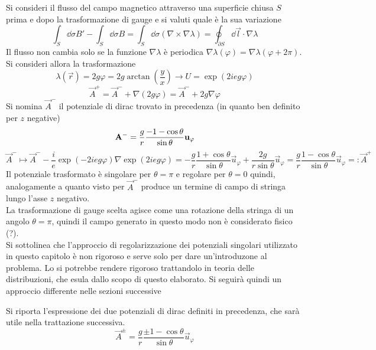 Si consideri il flusso del campo magnetico attraverso una superficie chiusa $S$
prima e dopo la trasformazione di gauge e si valuti quale è la sua variazione
$$
   \int_S \dd\sigma B' - \int_S \dd\sigma B = \int_S \dd\sigma (\nabla \times \nabla \lambda)
      = \oint_{\partial S} \dd\vec l \cdot \nabla \lambda
$$
Il flusso non cambia solo se la funzione $\nabla \lambda$ è periodica $\nabla
\lambda(\varphi) = \nabla \lambda( \varphi + 2\pi)$. Si consideri allora la trasformazione
$$
\lambda(\vec r) = 2g\varphi = 2g\arctan\left(\frac{y}{x}\right) \to U = \exp(2ieg\varphi)
$$
\begin{equation}\label{eq:gaugetrasf}
   \vec A ^+ = \vec A ^- + \nabla(2g \varphi) = \vec A ^- + 2g\nabla\varphi
\end{equation}
Si nomina $\vec A^-$ il potenziale di dirac trovato in precedenza (in quanto ben
definito per $z$ negative)
$$
   \vec A^- = \frac{g}{r}\frac{-1 - \cos\theta}{\sin\theta} \vec u _\varphi  \\
$$
$$
  \vec A ^- \mapsto \vec A ^- - \frac{i}{e} \exp( -2ieg\varphi )\nabla \exp(2ieg\varphi ) =
     -\frac{g}{r}\frac{1+\cos\theta}{\sin\theta}\vec u _\varphi
     + \frac{2g}{r\sin\theta}\vec u _\varphi
     = \frac{g}{r}\frac{1 - \cos\theta}{\sin\theta} \vec u _\varphi
     =: \vec A ^+
$$
Il potenziale trasformato è singolare per $\theta = \pi$ e regolare per
$\theta =  0$ quindi, analogamente a quanto visto per $\vec A^-$ produce un termine
di campo di stringa lungo l'asse $z$ negativo.\\
La trasformazione di gauge scelta agisce come una rotazione della stringa
di un angolo $\theta = \pi$, quindi il campo generato in questo modo non è
considerato fisico (?).\\

Si sottolinea che l'approccio di regolarizzazione dei potenziali singolari
utilizzato in questo capitolo è non rigoroso e serve solo per dare un'introduzone
al problema. Lo si potrebbe rendere rigoroso trattandolo in teoria delle
distribuzioni, che esula dallo scopo di questo elaborato. Si seguirà quindi
un approccio differente nelle sezioni successive

Si riporta l'espressione dei due potenziali di dirac definiti in precedenza, che
sarà utile nella trattazione successiva.
\begin{equation}\label{eq:localdiracpotential}
  \vec A^\pm = \frac{g}{r}\frac{\pm 1 - \cos\theta}{\sin\theta} \vec u _\varphi
\end{equation}


